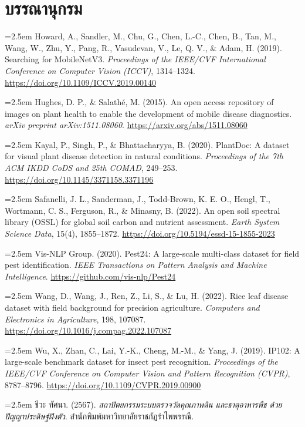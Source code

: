 \chapter*{บรรณานุกรม}

\newcommand{\bibentry}[1]{\noindent\hangindent=2.5em #1\par\vspace{7pt}}

\bibentry{Howard, A., Sandler, M., Chu, G., Chen, L.-C., Chen, B., Tan, M., Wang, W., Zhu, Y., Pang, R., Vasudevan, V., Le, Q. V., \& Adam, H. (2019). Searching for MobileNetV3. \textit{Proceedings of the IEEE/CVF International Conference on Computer Vision (ICCV)}, 1314--1324. \url{https://doi.org/10.1109/ICCV.2019.00140}}

\bibentry{Hughes, D. P., \& Salathé, M. (2015). An open access repository of images on plant health to enable the development of mobile disease diagnostics. \textit{arXiv preprint arXiv:1511.08060}. \url{https://arxiv.org/abs/1511.08060}}

\bibentry{Kayal, P., Singh, P., \& Bhattacharyya, B. (2020). PlantDoc: A dataset for visual plant disease detection in natural conditions. \textit{Proceedings of the 7th ACM IKDD CoDS and 25th COMAD}, 249--253. \url{https://doi.org/10.1145/3371158.3371196}}

\bibentry{Safanelli, J. L., Sanderman, J., Todd-Brown, K. E. O., Hengl, T., Wortmann, C. S., Ferguson, R., \& Minasny, B. (2022). An open soil spectral library (OSSL) for global soil carbon and nutrient assessment. \textit{Earth System Science Data}, 15(4), 1855--1872. \url{https://doi.org/10.5194/essd-15-1855-2023}}

\bibentry{Vis-NLP Group. (2020). Pest24: A large-scale multi-class dataset for field pest identification. \textit{IEEE Transactions on Pattern Analysis and Machine Intelligence}. \url{https://github.com/vis-nlp/Pest24}}

\bibentry{Wang, D., Wang, J., Ren, Z., Li, S., \& Lu, H. (2022). Rice leaf disease dataset with field background for precision agriculture. \textit{Computers and Electronics in Agriculture}, 198, 107087. \url{https://doi.org/10.1016/j.compag.2022.107087}}

\bibentry{Wu, X., Zhan, C., Lai, Y.-K., Cheng, M.-M., \& Yang, J. (2019). IP102: A large-scale benchmark dataset for insect pest recognition. \textit{Proceedings of the IEEE/CVF Conference on Computer Vision and Pattern Recognition (CVPR)}, 8787--8796. \url{https://doi.org/10.1109/CVPR.2019.00900}}

\bibentry{ชีวะ ทัศนา. (2567). \textit{สถาปัตยกรรมระบบตรวจวัดคุณภาพดิน และธาตุอาหารพืช ด้วยปัญญาประดิษฐ์ฝังตัว}. สำนักพิมพ์มหาวิทยาลัยราชภัฏรำไพพรรณี.}
